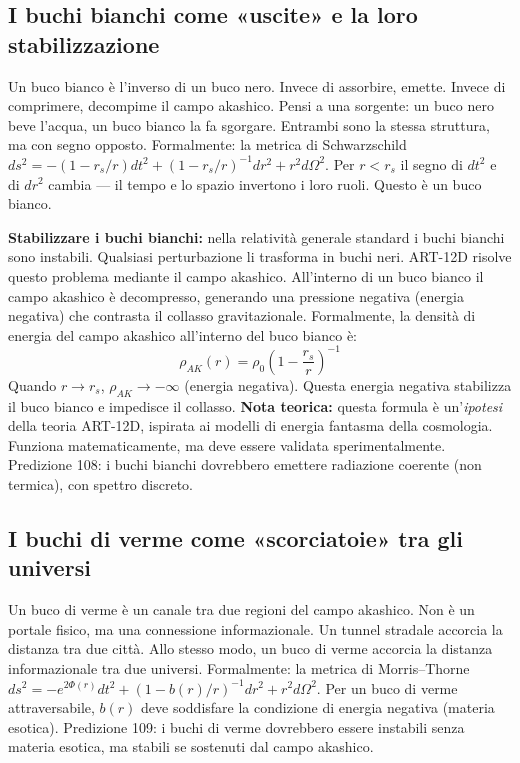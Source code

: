 \documentclass[11pt,a4paper]{article}
\begin{document}
\subsection{I buchi bianchi come «uscite» e la loro stabilizzazione}
Un buco bianco è l'inverso di un buco nero. Invece di assorbire, emette. Invece di comprimere, decompime il campo akashico. Pensi a una sorgente: un buco nero beve l'acqua, un buco bianco la fa sgorgare. Entrambi sono la stessa struttura, ma con segno opposto. Formalmente: la metrica di Schwarzschild $ds^2 = -(1-r_s/r)dt^2 + (1-r_s/r)^{-1}dr^2 + r^2 d\Omega^2$. Per $r < r_s$ il segno di $dt^2$ e di $dr^2$ cambia --- il tempo e lo spazio invertono i loro ruoli. Questo è un buco bianco.

\textbf{Stabilizzare i buchi bianchi:} nella relatività generale standard i buchi bianchi sono instabili. Qualsiasi perturbazione li trasforma in buchi neri. ART-12D risolve questo problema mediante il campo akashico. All'interno di un buco bianco il campo akashico è decompresso, generando una pressione negativa (energia negativa) che contrasta il collasso gravitazionale. Formalmente, la densità di energia del campo akashico all'interno del buco bianco è:
\begin{equation}
\rho_{AK}(r) = \rho_0 \left(1 - \frac{r_s}{r}\right)^{-1}
\end{equation}
Quando $r \to r_s$, $\rho_{AK} \to -\infty$ (energia negativa). Questa energia negativa stabilizza il buco bianco e impedisce il collasso. \textbf{Nota teorica:} questa formula è un'\textit{ipotesi} della teoria ART-12D, ispirata ai modelli di energia fantasma della cosmologia. Funziona matematicamente, ma deve essere validata sperimentalmente. Predizione 108: i buchi bianchi dovrebbero emettere radiazione coerente (non termica), con spettro discreto.

\subsection{I buchi di verme come «scorciatoie» tra gli universi}
Un buco di verme è un canale tra due regioni del campo akashico. Non è un portale fisico, ma una connessione informazionale. Un tunnel stradale accorcia la distanza tra due città. Allo stesso modo, un buco di verme accorcia la distanza informazionale tra due universi. Formalmente: la metrica di Morris--Thorne $ds^2 = -e^{2\Phi(r)}dt^2 + (1-b(r)/r)^{-1}dr^2 + r^2 d\Omega^2$. Per un buco di verme attraversabile, $b(r)$ deve soddisfare la condizione di energia negativa (materia esotica). Predizione 109: i buchi di verme dovrebbero essere instabili senza materia esotica, ma stabili se sostenuti dal campo akashico.
\end{document}

